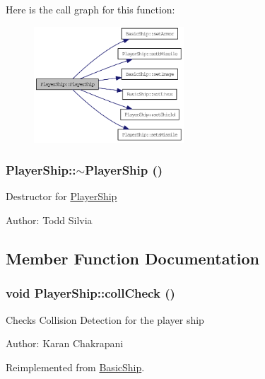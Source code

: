 Here is the call graph for this function:\nopagebreak
\begin{figure}[H]
\begin{center}
\leavevmode
\includegraphics[width=159pt]{class_player_ship_a7e4ea77e9ad9182c6277575d82366719_cgraph}
\end{center}
\end{figure}
\hypertarget{class_player_ship_a167478327150c2a6e12539fcfabe8d6c}{
\subsubsection[{$\sim$PlayerShip}]{\setlength{\rightskip}{0pt plus 5cm}PlayerShip::$\sim$PlayerShip ()}}
\label{class_player_ship_a167478327150c2a6e12539fcfabe8d6c}
Destructor for \hyperlink{class_player_ship}{PlayerShip}

Author: Todd Silvia 

\subsection{Member Function Documentation}
\hypertarget{class_player_ship_a9c3745489576a8c3027b9e17ac2046fb}{
\subsubsection[{collCheck}]{\setlength{\rightskip}{0pt plus 5cm}void PlayerShip::collCheck ()}}
\label{class_player_ship_a9c3745489576a8c3027b9e17ac2046fb}
Checks Collision Detection for the player ship

Author: Karan Chakrapani 

Reimplemented from \hyperlink{class_basic_ship_a30787afde7d49a62891c1b9e73e9b7d9}{BasicShip}.

